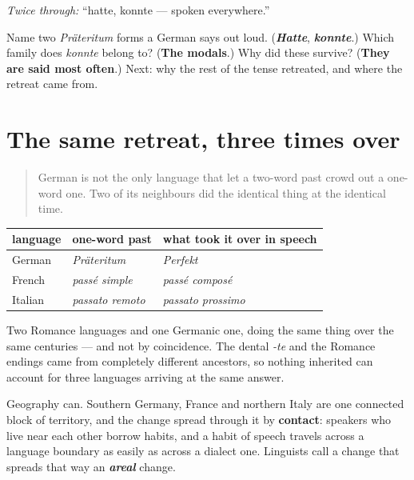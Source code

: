 \emph{Twice through:} \textquotedblleft{}hatte, konnte — spoken everywhere.\textquotedblright{}

\begin{tcolorbox}[breakable,colback=teal!4,colframe=teal!35!black,title={Before you move on}]
Name two \emph{Präteritum} forms a German says out loud. (\emph{\textbf{Hatte}}, \emph{\textbf{konnte}}.) Which family does \emph{konnte} belong to? (\textbf{The modals}.) Why did these survive? (\textbf{They are said most often}.) Next: why the rest of the tense retreated, and where the retreat came from.
\end{tcolorbox}
\section[areale Veränderung]{The same retreat, three times over}

\label{lesson:GE-C15-praeteritum-map}



\begin{quote}
German is not the only language that let a two-word past crowd out a one-word one. Two of its neighbours did the identical thing at the identical time.
\end{quote}

\begin{cousinweb}
\noindent
\begin{tabularx}{\linewidth}{@{}>{\raggedright\arraybackslash}X>{\raggedright\arraybackslash}X>{\raggedright\arraybackslash}X@{}}
\toprule
\textbf{language} & \textbf{one-word past} & \textbf{what took it over in speech} \\
\midrule
German & \emph{Präteritum} & \emph{Perfekt} \\
French & \emph{passé simple} & \emph{passé composé} \\
Italian & \emph{passato remoto} & \emph{passato prossimo} \\
\bottomrule
\end{tabularx}

Two Romance languages and one Germanic one, doing the same thing over the same centuries — and not by coincidence. The dental \emph{-te} and the Romance endings came from completely different ancestors, so nothing inherited can account for three languages arriving at the same answer.

Geography can. Southern Germany, France and northern Italy are one connected block of territory, and the change spread through it by \textbf{contact}: speakers who live near each other borrow habits, and a habit of speech travels across a language boundary as easily as across a dialect one. Linguists call a change that spreads that way an \emph{\textbf{areal}} change.
\end{cousinweb}

